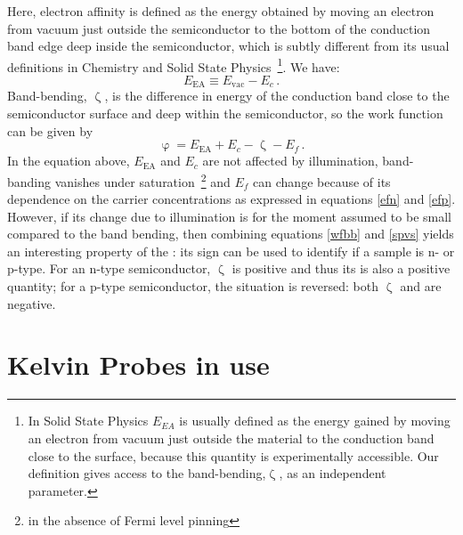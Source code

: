 Here, electron affinity is defined as the energy obtained by moving an electron from vacuum just outside the semiconductor to the bottom of the conduction band edge deep inside the semiconductor, which is subtly different from its usual definitions in Chemistry and Solid State Physics~\footnote{In Solid State Physics $E_{EA}$ is usually defined as the energy gained by moving an electron from vacuum just outside the material to the conduction band close to the surface, because this quantity is experimentally accessible. Our definition gives access to the band-bending,$\upzeta$, as an independent parameter.}. We have:
\begin{equation}
\label{Eea}
	E_{\text{EA}} \equiv E_{\text{vac}} - E_c \, .
\end{equation}
Band-bending, $\upzeta$, is the difference in energy of the conduction band close to the semiconductor surface and deep within the semiconductor, so the work function can be given by
\begin{equation}
\label{wfbb}
	\upvarphi = E_{\text{EA}} + E_c - \upzeta - E_f \, .
\end{equation}
In the equation above, $E_{\text{EA}}$ and $E_c$ are not affected by illumination, band-banding vanishes under saturation~\footnote{in the absence of Fermi level pinning} and $E_f$ can change because of its dependence on the carrier concentrations as expressed in equations \eqref{efn} and \eqref{efp}. However, if its change due to illumination is for the moment assumed to be small compared to the band bending, then combining equations \eqref{wfbb} and \eqref{spvs} yields an interesting property of the \spv{}: its sign can be used to identify if a sample is n- or p-type. For an n-type semiconductor, $\upzeta$ is positive and thus its \spv{} is also a positive quantity; for a p-type semiconductor, the situation is reversed: both $\upzeta$ and \spv{} are negative.


\section{Kelvin Probes in use}
\label{sec:kp}

